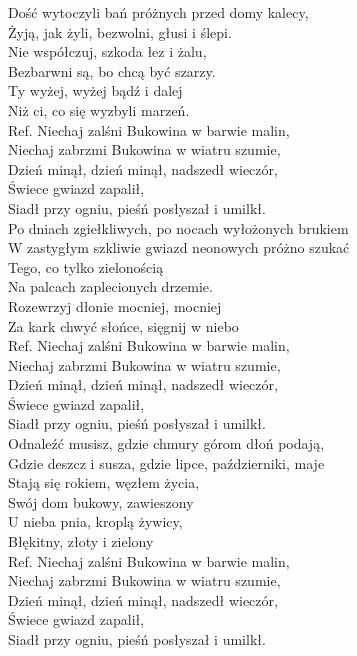{}

Dość wytoczyli bań próżnych przed domy kalecy, \\
Żyją, jak żyli, bezwolni, głusi i ślepi. \tab{}\\
Nie współczuj, szkoda łez i żalu, \tab{}\\
Bezbarwni są, bo chcą być szarzy. \tab{}\\
Ty wyżej, wyżej bądź i dalej \tab{}\tab{}\\
Niż ci, co się wyzbyli marzeń. \tab{}\tab{}\\
\hops
Ref. Niechaj zalśni Bukowina w barwie malin, \tab{}\\
 Niechaj zabrzmi Bukowina w wiatru szumie, \\
 Dzień minął, dzień minął, nadszedł wieczór, \\
 Świece gwiazd zapalił, \tab{}\tab{}\\
 Siadł przy ogniu, pieśń posłyszał i umilkł. \\
\hops
Po dniach zgiełkliwych, po nocach wyłożonych brukiem \\
W zastygłym szkliwie gwiazd neonowych próżno szukać \\
Tego, co tylko zielonością \\
Na palcach zaplecionych drzemie. \\
Rozewrzyj dłonie mocniej, mocniej \\
Za kark chwyć słońce, sięgnij w niebo \\
\hops
Ref. Niechaj zalśni Bukowina w barwie malin, \\
 Niechaj zabrzmi Bukowina w wiatru szumie, \\
 Dzień minął, dzień minął, nadszedł wieczór, \\
 Świece gwiazd zapalił, \\
 Siadł przy ogniu, pieśń posłyszał i umilkł. \\
\hops
Odnaleźć musisz, gdzie chmury górom dłoń podają, \\
Gdzie deszcz i susza, gdzie lipce, październiki, maje \\
Stają się rokiem, węzłem życia, \\
Swój dom bukowy, zawieszony \\
U nieba pnia, kroplą żywicy, \\
Błękitny, złoty i zielony \\
\hops
Ref. Niechaj zalśni Bukowina w barwie malin, \\
 Niechaj zabrzmi Bukowina w wiatru szumie, \\
 Dzień minął, dzień minął, nadszedł wieczór, \\
 Świece gwiazd zapalił, \\
 Siadł przy ogniu, pieśń posłyszał i umilkł.
